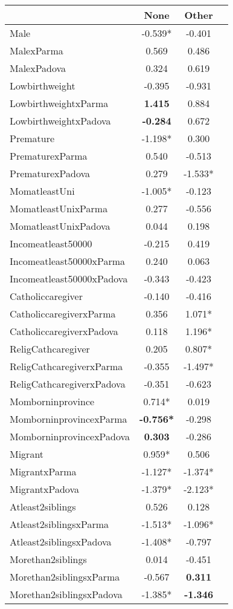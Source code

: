 \begin{tabular}{l c c c}
\toprule
& None & Other \\
\midrule
Male & -0.539* &    -0.401 \\
MalexParma &     0.569 &     0.486 \\
MalexPadova &     0.324 &     0.619 \\
Lowbirthweight &    -0.395 &    -0.931 \\
LowbirthweightxParma & \textbf{    1.415} &     0.884 \\
LowbirthweightxPadova & \textbf{   -0.284} &     0.672 \\
Premature & -1.198* &     0.300 \\
PrematurexParma &     0.540 &    -0.513 \\
PrematurexPadova &     0.279 & -1.533* \\
MomatleastUni & -1.005* &    -0.123 \\
MomatleastUnixParma &     0.277 &    -0.556 \\
MomatleastUnixPadova &     0.044 &     0.198 \\
Incomeatleast50000 &    -0.215 &     0.419 \\
Incomeatleast50000xParma &     0.240 &     0.063 \\
Incomeatleast50000xPadova &    -0.343 &    -0.423 \\
Catholiccaregiver &    -0.140 &    -0.416 \\
CatholiccaregiverxParma &     0.356 & 1.071* \\
CatholiccaregiverxPadova &     0.118 & 1.196* \\
ReligCathcaregiver &     0.205 & 0.807* \\
ReligCathcaregiverxParma &    -0.355 & -1.497* \\
ReligCathcaregiverxPadova &    -0.351 &    -0.623 \\
Momborninprovince & 0.714* &     0.019 \\
MomborninprovincexParma & \textbf{-0.756*} &    -0.298 \\
MomborninprovincexPadova & \textbf{    0.303} &    -0.286 \\
Migrant & 0.959* &     0.506 \\
MigrantxParma & -1.127* & -1.374* \\
MigrantxPadova & -1.379* & -2.123* \\
Atleast2siblings &     0.526 &     0.128 \\
Atleast2siblingsxParma & -1.513* & -1.096* \\
Atleast2siblingsxPadova & -1.408* &    -0.797 \\
Morethan2siblings &     0.014 &    -0.451 \\
Morethan2siblingsxParma &    -0.567 & \textbf{    0.311} \\
Morethan2siblingsxPadova & -1.385* & \textbf{   -1.346} \\
\bottomrule
\end{tabular}
